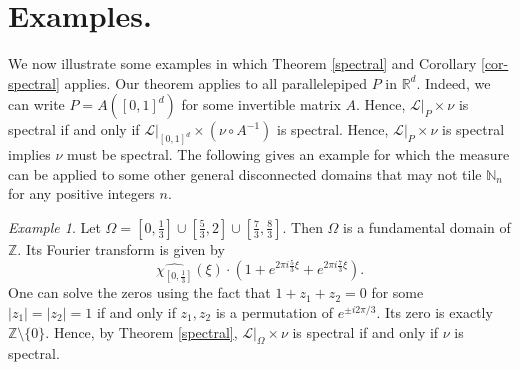 \documentclass[reqno,a4paper,12pt]{amsart}
\numberwithin{equation}{section}
\newcommand{\R}{{\mathbb R}}
\newcommand{\Z}{{\mathbb Z}}
\newcommand{\N}{{\mathbb N}}
\newcommand{\Set}[1]{{\left\{{#1}\right\}}}
\newcommand{\ft}[1]{\widehat{#1}}
\newcounter{rem}
\theoremstyle{remark}
\newtheorem{example}{Example}[section]
\numberwithin{equation}{section}
\def\N{\mathbb{N}}
\def\Z{\mathbb{Z}}
\def\R{\mathbb{R}}
\def\blue{\blue}
\def\blue#1{\textcolor[rgb]{0.00,0.00,1.00}{#1}}
\def\red#1{\textcolor[rgb]{1.00,0.00,0.00}{#1}}
\begin{document}
{


\section{Examples.}\label{sec4} We now illustrate some examples in which Theorem \ref{spectral} and Corollary \ref{cor-spectral} applies. Our theorem applies to all parallelepiped $P$ in $\R^d$. Indeed, we can write $P = A ([0,1]^d)$ for some invertible matrix $A$. Hence, ${\mathcal L}|_P\times \nu$ is spectral if and only if ${\mathcal L}|_{[0,1]^d}\times (\nu\circ A^{-1})$ is spectral. Hence, ${\mathcal L}|_P\times \nu$ is spectral implies $\nu$ must be spectral. The following gives an example for which the measure can be applied to some other general disconnected domains that may not tile $\N_n$ for any positive integers $n$. 

\begin{example}
Let $\Omega = [0,\frac13]\cup [\frac{5}{3},2]\cup [\frac{7}{3},\frac83]$. Then $\Omega$ is a fundamental domain of $\Z$. Its Fourier transform is given by 
$$
\widehat{\chi_{[0,\frac13]}} (\xi)\cdot \left(1+ e^{2\pi i \frac{5}{3}\xi}+e^{2\pi i \frac{7}{3}\xi}\right). 
$$
One can solve the zeros using the fact that $1+z_1+z_2=0$ for some $|z_1|=|z_2|=1$ if and only if $z_1,z_2$ is a permutation of $e^{\pm i2\pi/3}$. Its zero is exactly $\Z\setminus\{0\}$. Hence, by Theorem \ref{spectral}, ${\mathcal L}|_{\Omega}\times \nu$ is spectral if and only if $\nu$ is spectral. 
\end{example}

}
\end{document}
